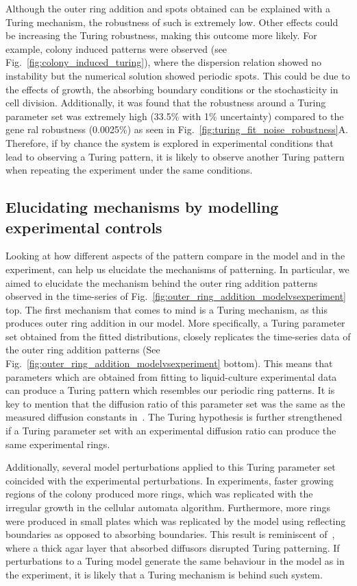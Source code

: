 Although the outer ring addition and spots obtained can be explained with a Turing mechanism, the robustness of such is extremely low.
Other effects could be increasing the Turing robustness, making this outcome more likely.
For example, colony induced patterns were observed (see Fig.~\ref{fig:colony_induced_turing}), where the dispersion relation showed no instability but the numerical solution showed periodic spots.
This could be due to the effects of growth, the absorbing boundary conditions or the stochasticity in cell division.
Additionally, it was found that the robustness around a Turing parameter set was extremely high (33.5\% with 1\% uncertainty) compared to the gene ral robustness (0.0025\%) as seen in Fig.~\ref{fig:turing_fit_noise_robustness}A.
Therefore, if by chance the system is explored in experimental conditions that lead to observing a Turing pattern, it is likely to observe another Turing pattern when repeating the experiment under the same conditions.

\subsection{Elucidating mechanisms by modelling experimental controls}
Looking at how different aspects of the pattern compare in the model and in the experiment, can help us elucidate the mechanisms of patterning.
In particular, we aimed to elucidate the mechanism behind the outer ring addition patterns observed in the time-series of Fig.~\ref{fig:outer_ring_addition_modelvsexperiment} top.
The first mechanism that comes to mind is a Turing mechanism, as this produces outer ring addition in our model.
More specifically, a Turing parameter set obtained from the fitted distributions, closely replicates the time-series data of the outer ring addition patterns (See Fig.~\ref{fig:outer_ring_addition_modelvsexperiment} bottom).
This means that parameters which are obtained from fitting to liquid-culture experimental data can produce a Turing pattern which resembles our periodic ring patterns.
It is key to mention that the diffusion ratio of this parameter set was the same as the measured diffusion constants in~\cite{tica_diffusers}.
The Turing hypothesis is further strengthened if a Turing parameter set with an experimental diffusion ratio can produce the same experimental rings.

Additionally, several model perturbations applied to this Turing parameter set coincided with the experimental perturbations.
In experiments, faster growing regions of the colony produced more rings, which was replicated with the irregular growth in the cellular automata algorithm.
Furthermore, more rings were produced in small plates which was replicated by the model using reflecting boundaries as opposed to absorbing boundaries.
This result is reminiscent of~\cite{Krause2020}, where a thick agar layer that absorbed diffusors disrupted Turing patterning.
If perturbations to a Turing model generate the same behaviour in the model as in the experiment, it is likely that a Turing mechanism is behind such system.

